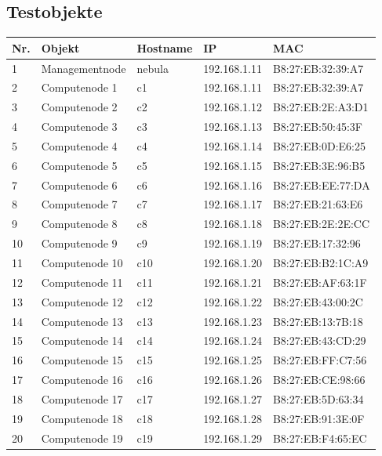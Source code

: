 \subsection{Testobjekte}
\begin{table}[H]
\centering
\begin{tabular}{p{1cm}p{3cm}p{3cm}p{4cm}p{4cm}}
\hline
\rowcolor{heading} \textbf{Nr.} & \textbf{Objekt} & \textbf{Hostname} & \textbf{IP} & \textbf{MAC} \\\hline
1 & Managementnode & nebula & 192.168.1.11 & B8:27:EB:32:39:A7\\\hline
2 & Computenode 1 & c1 & 192.168.1.11 & B8:27:EB:32:39:A7\\\hline
3 & Computenode 2 & c2 & 192.168.1.12 & B8:27:EB:2E:A3:D1\\\hline
4 & Computenode 3 & c3 & 192.168.1.13 & B8:27:EB:50:45:3F\\\hline
5 & Computenode 4 & c4 & 192.168.1.14 & B8:27:EB:0D:E6:25\\\hline
6 & Computenode 5 & c5 & 192.168.1.15 & B8:27:EB:3E:96:B5\\\hline
7 & Computenode 6 & c6 & 192.168.1.16 & B8:27:EB:EE:77:DA\\\hline
8 & Computenode 7 & c7 & 192.168.1.17 & B8:27:EB:21:63:E6\\\hline
9 & Computenode 8 & c8 & 192.168.1.18 & B8:27:EB:2E:2E:CC\\\hline
10 & Computenode 9 & c9 & 192.168.1.19 & B8:27:EB:17:32:96\\\hline
11 & Computenode 10 & c10 & 192.168.1.20 & B8:27:EB:B2:1C:A9\\\hline
12 & Computenode 11 & c11 & 192.168.1.21 & B8:27:EB:AF:63:1F\\\hline
13 & Computenode 12 & c12 & 192.168.1.22 & B8:27:EB:43:00:2C\\\hline
14 & Computenode 13 & c13 & 192.168.1.23 & B8:27:EB:13:7B:18\\\hline
15 & Computenode 14 & c14 & 192.168.1.24 & B8:27:EB:43:CD:29\\\hline
16 & Computenode 15 & c15 & 192.168.1.25 & B8:27:EB:FF:C7:56\\\hline
17 & Computenode 16 & c16 & 192.168.1.26 & B8:27:EB:CE:98:66\\\hline
18 & Computenode 17 & c17 & 192.168.1.27 & B8:27:EB:5D:63:34\\\hline
19 & Computenode 18 & c18 & 192.168.1.28 & B8:27:EB:91:3E:0F\\\hline
20 & Computenode 19 & c19 & 192.168.1.29 & B8:27:EB:F4:65:EC\\\hline

\end{tabular}
\end{table}
